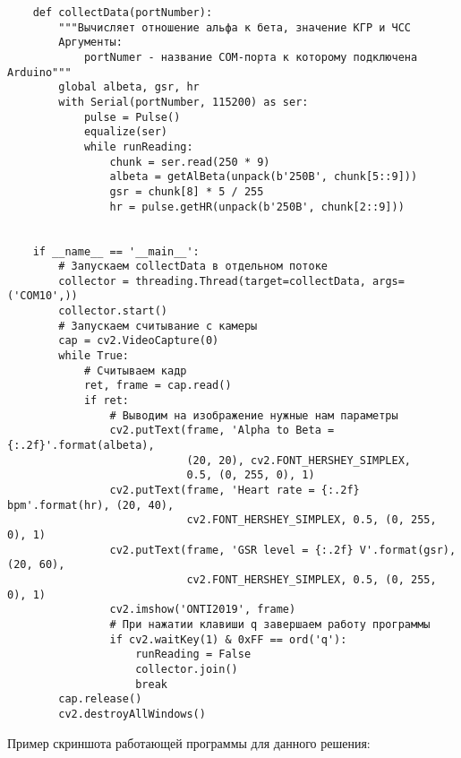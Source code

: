 \begin{verbatim}
    def collectData(portNumber):
        """Вычисляет отношение альфа к бета, значение КГР и ЧСС
        Аргументы:
            portNumer - название COM-порта к которому подключена Arduino"""
        global albeta, gsr, hr
        with Serial(portNumber, 115200) as ser:
            pulse = Pulse()
            equalize(ser)
            while runReading:
                chunk = ser.read(250 * 9)
                albeta = getAlBeta(unpack(b'250B', chunk[5::9]))
                gsr = chunk[8] * 5 / 255
                hr = pulse.getHR(unpack(b'250B', chunk[2::9]))


    if __name__ == '__main__':
        # Запускаем collectData в отдельном потоке
        collector = threading.Thread(target=collectData, args=('COM10',))
        collector.start()
        # Запускаем считывание с камеры
        cap = cv2.VideoCapture(0)
        while True:
            # Считываем кадр
            ret, frame = cap.read()
            if ret:
                # Выводим на изображение нужные нам параметры
                cv2.putText(frame, 'Alpha to Beta = {:.2f}'.format(albeta),
                            (20, 20), cv2.FONT_HERSHEY_SIMPLEX,
                            0.5, (0, 255, 0), 1)
                cv2.putText(frame, 'Heart rate = {:.2f} bpm'.format(hr), (20, 40),
                            cv2.FONT_HERSHEY_SIMPLEX, 0.5, (0, 255, 0), 1)
                cv2.putText(frame, 'GSR level = {:.2f} V'.format(gsr), (20, 60),
                            cv2.FONT_HERSHEY_SIMPLEX, 0.5, (0, 255, 0), 1)
                cv2.imshow('ONTI2019', frame)
                # При нажатии клавиши q завершаем работу программы
                if cv2.waitKey(1) & 0xFF == ord('q'):
                    runReading = False
                    collector.join()
                    break
        cap.release()
        cv2.destroyAllWindows()

\end{verbatim}

Пример скриншота работающей программы для данного решения:

